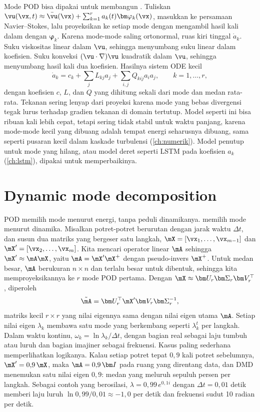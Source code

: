 Mode POD bisa dipakai untuk membangun . Tuliskan
$\vu(\vx,t)\approx\bar\vu(\vx)+\sum_{k=1}^ra_k(t)\bm\varphi_k(\vx)$, masukkan ke persamaan Navier--Stokes,
lalu proyeksikan ke setiap mode dengan mengambil hasil kali dalam dengan $\bm\varphi_k$. Karena mode-mode saling
ortonormal, ruas kiri tinggal $\dot a_k$. Suku viskositas linear dalam $\vu$, sehingga menyumbang suku linear dalam
koefisien. Suku konveksi $(\vu\cdot\nabla)\vu$ kuadratik dalam $\vu$, sehingga menyumbang hasil kali dua koefisien.
Hasilnya sistem ODE kecil
\begin{equation}
\dot a_k=c_k+\sum_jL_{kj}a_j+\sum_{i,j}Q_{kij}a_ia_j,\qquad k=1,\dots,r,
\end{equation}
dengan koefisien $c$, $L$, dan $Q$ yang dihitung sekali dari mode dan medan rata-rata. Tekanan sering lenyap dari
proyeksi karena mode yang bebas divergensi tegak lurus terhadap gradien tekanan di domain tertutup. Model seperti ini bisa
ribuan kali lebih cepat, tetapi sering tidak stabil untuk waktu panjang, karena mode-mode kecil yang
dibuang adalah tempat energi seharusnya dibuang, sama seperti pusaran kecil dalam kaskade turbulensi
(\cref{ch:numerik}). Model penutup untuk mode yang hilang, atau model deret seperti LSTM pada koefisien
$a_k$ (\cref{ch:lstm}), dipakai untuk memperbaikinya.

\section{Dynamic mode decomposition}

POD memilih mode menurut energi, tanpa peduli dinamikanya. 
\citep{schmid2010} memilih mode menurut dinamika. Misalkan potret-potret berurutan dengan jarak waktu
$\Delta t$, dan susun dua matriks yang bergeser satu langkah, $\mX=[\vx_1,\dots,\vx_{m-1}]$ dan
$\mX'=[\vx_2,\dots,\vx_m]$. Kita mencari operator linear $\mA$ sehingga $\mX'\approx\mA\mX$, yaitu
$\mA=\mX'\mX^+$ dengan pseudo-invers $\mX^+$. Untuk medan besar, $\mA$ berukuran $n\times n$ dan
terlalu besar untuk dibentuk, sehingga kita memproyeksikannya ke $r$ mode POD pertama. Dengan
$\mX\approx\bm U_r\bm\Sigma_r\bm V_r^\top$, diperoleh
\begin{equation}
\tilde{\mA}=\bm U_r^\top\mX'\bm V_r\bm\Sigma_r^{-1},
\end{equation}
matriks kecil $r\times r$ yang nilai eigennya sama dengan nilai eigen utama $\mA$. Setiap nilai eigen
$\lambda_k$ membawa satu mode yang berkembang seperti $\lambda_k^t$ per langkah. Dalam waktu kontinu,
$\omega_k=\ln\lambda_k/\Delta t$, dengan bagian real sebagai laju tumbuh atau luruh dan bagian imajiner
sebagai frekuensi. Kasus paling sederhana memperlihatkan logikanya. Kalau setiap potret tepat $0{,}9$ kali potret sebelumnya,
$\mX'=0{,}9\,\mX$, maka $\mA=0{,}9\,\bm I$ pada ruang yang direntang data, dan DMD menemukan satu nilai eigen $0{,}9$:
medan yang meluruh sepuluh persen per langkah. Sebagai contoh yang berosilasi, $\lambda=0{,}99\,e^{0{,}1i}$ dengan $\Delta t=0{,}01$ detik memberi
laju luruh $\ln0{,}99/0{,}01\approx-1{,}0$ per detik dan frekuensi sudut 10 radian per detik.

